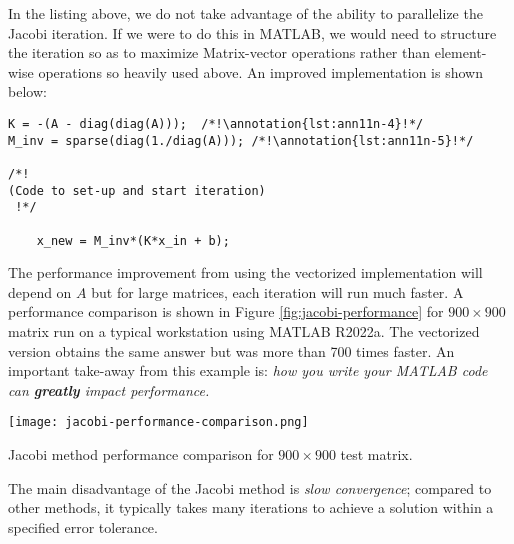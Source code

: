 In the listing above, we do not take advantage of the ability to parallelize the Jacobi iteration.  If we were to do this in MATLAB, we would need to structure the iteration so as to maximize Matrix-vector operations rather than element-wise operations so heavily used above.  An improved implementation is shown below:
\begin{lstlisting}[style=myMatlab]
K = -(A - diag(diag(A)));  /*!\annotation{lst:ann11n-4}!*/
M_inv = sparse(diag(1./diag(A))); /*!\annotation{lst:ann11n-5}!*/

/*! 
(Code to set-up and start iteration)
 !*/

    x_new = M_inv*(K*x_in + b);

\end{lstlisting}
The performance improvement from using the vectorized implementation will depend on $A$ but for large matrices, each iteration will run much faster.  A performance comparison is shown in Figure \ref{fig:jacobi-performance} for $900 \times 900$ matrix run on a typical workstation using MATLAB R2022a.  The vectorized version obtains the same answer but was more than 700 times faster.  An important take-away from this example is: \emph{how you write your MATLAB code can \textbf{greatly} impact performance.}
\begin{marginfigure}
\texttt{[image: jacobi-performance-comparison.png]}
\caption{Jacobi method performance comparison for $900 \times 900$ test matrix.}
\label{fig:jacobi-performance}
\end{marginfigure}

The main disadvantage of the Jacobi method is \emph{slow convergence}; compared to other methods, it typically takes many iterations to achieve a solution within a specified error tolerance.

